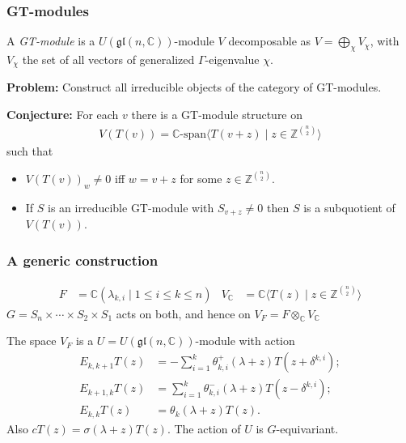 \documentclass[smaller,usepdftitle=false]{beamer}
\newcommand\CC{\mathbb C}
\newcommand\ZZ{\mathbb Z}
\newcommand\ot{\otimes}
\newcommand\gl{\mathfrak{gl}}
\def\pausa{\pause \bigskip}
\begin{document}
\begin{frame}
\frametitle{GT-modules}
\begin{Definition}
A \emph{GT-module} is a $U(\gl(n,\CC))$-module $V$ decomposable as $V = 
\bigoplus_\chi V_\chi$, with $V_\chi$ the set of all vectors of
generalized $\Gamma$-eigenvalue $\chi$.
\end{Definition}

\textbf{Problem:} Construct all irreducible objects of the category of 
GT-modules.
\pause

\textbf{Conjecture:} For each $v$ there is a GT-module structure on
\begin{align*}
V(T(v)) 
  = \CC \mbox{-span} \langle T(v + z) \mid z \in \ZZ^{\binom{n}{2}} \rangle
\end{align*}
such that
\begin{itemize}
\item $V(T(v))_w \neq 0$ iff $w = v+z$ for some $z \in \ZZ^{\binom{n}{2}}$.

\item If $S$ is an irreducible GT-module with $S_{v+z} \neq 0$ then $S$ is a 
subquotient of $V(T(v))$.
\end{itemize}
\end{frame}

\begin{frame}
\frametitle{A generic construction}
\begin{align*}
F &= \CC(\lambda_{k,i} \mid 1 \leq i \leq k \leq n) &
V_\CC &= \CC\langle T(z) \mid z \in \ZZ^{\binom{n}{2}}\rangle
\end{align*}
$G = S_n \times \cdots \times S_2 \times S_1$ acts on both, and hence on $V_F 
= F \ot_\CC V_\CC$

\pausa

\begin{Theorem}
The space $V_F$ is a $U = U(\gl(n,\CC))$-module with action
\vspace{-.3cm}
\begin{align*}
E_{k,k+1} T(z) &= - \sum_{i=1}^k \theta^+_{k,i}(\lambda + z) 
  T(z+\delta^{k,i}); \\
E_{k+1,k} T(z) &= \sum_{i=1}^k \theta^-_{k,i}(\lambda + z) 
  T(z -\delta^{k,i}); \\
E_{k,k} T(z) &= \theta_k(\lambda + z) T(z).
\end{align*}
Also $c T(z) = \sigma(\lambda + z) T(z)$. The action of $U$ is $G$-equivariant.
\end{Theorem}
\end{frame}
\end{document}
